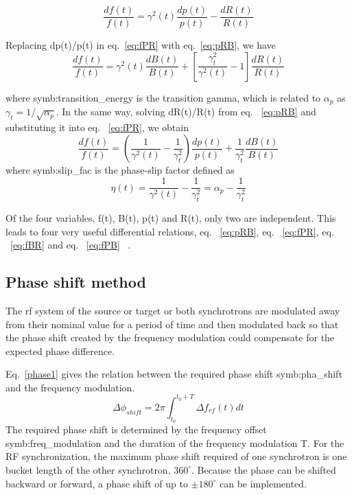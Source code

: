 \begin{equation}
\label{eq:fPR}
\frac{df(t)}{f(t)} ={\gamma^2(t)}\frac{dp(t)}{p(t)}-\frac{dR(t)}{R(t)} 
\end{equation}

Replacing dp(t)/p(t) in eq.~\ref{eq:fPR} with eq.~\ref{eq:pRB}, we have
\begin{equation}
\label{eq:fBR}
\frac{df(t)}{f(t)} ={\gamma^2(t)}\frac{dB(t)}{B(t)}+[\frac{\gamma_t^2}{\gamma^2(t)}-1]\frac{dR(t)}{R(t)} 
\end{equation}

where \gls{symb:transition_energy} is the transition gamma, which is related to $\alpha_p$ as $\gamma_t=1/\sqrt{\alpha_p}$. In the same way, solving dR(t)/R(t) from eq. ~\ref{eq:pRB} and substituting it into eq. ~\ref{eq:fPR}, we obtain
\begin{equation}
\label{eq:fPB}
\frac{df(t)}{f(t)} =(\frac{1}{\gamma^2(t)}-\frac{1}{\gamma_t^2}) \frac{dp(t)}{p(t)}+\frac{1}{\gamma_t^2}\frac{dB(t)}{B(t)} 
\end{equation}
where \gls{symb:slip_fac} is the phase-slip factor defined as
\begin{equation}
\label{eq:phse_slip}
\eta(t) =\frac{1}{\gamma^2(t)}-\frac{1}{\gamma_t^2}=\alpha_p-\frac{1}{\gamma_t^2}
\end{equation}


Of the four variables, f(t), B(t), p(t) and R(t), only two are independent. This leads to four very useful differential relations, eq. ~\ref{eq:pRB}, eq. ~\ref{eq:fPR}, eq. ~\ref{eq:fBR} and eq. ~\ref{eq:fPB} ~\cite{ezura_beam-dynamics_2008, bovet_selection_1970}. 

\subsection{Phase shift method}

The rf system of the source or target or both synchrotrons are modulated away from their nominal value for a period of time and then modulated back so that the phase shift created by the frequency modulation could compensate for the expected phase difference. 

Eq.~\ref{phase1} gives the relation between the required phase shift \gls{symb:pha_shift} and the frequency modulation. 
\begin{equation}
\Delta \phi_{shift}= 2\pi \int_{t_0}^{t_0+T} \Delta f_{rf}(t)dt \label{phase1}
\end{equation}
The required phase shift is determined by the frequency offset \gls{symb:freq_modulation} and the duration of the frequency modulation T. For the RF synchronization, the maximum phase shift required of one synchrotron is one bucket length of the other synchrotron, $360^\circ$. Because the phase can be shifted backward or forward, a phase shift of up to $\pm 180^\circ$ can be implemented. 

